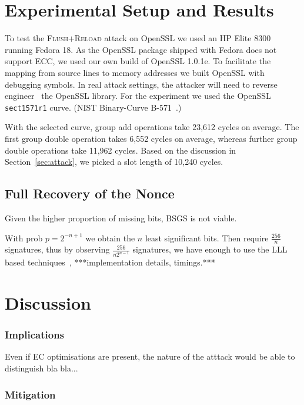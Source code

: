 \documentclass[twocolumn]{article}
\newcommand{\fl}{\textsc{Flu\-sh+\allowbreak Re\-load}\xspace}
\newcommand{\myupcase}[1]{\uppercase{#1}}
\begin{document}
\section{Experimental Setup and Results}\label{sec:results}

To test the \fl attack on OpenSSL we used an HP Elite 8300 running Fedora 18. As the OpenSSL package shipped with Fedora does not support \myupcase{ecc},
we used our own build of OpenSSL 1.0.1e. To facilitate the mapping from source lines to memory addresses we built OpenSSL with debugging symbols.
In real attack settings, the attacker will need to reverse engineer~\cite{cipsero10software} the OpenSSL library. For the experiment we used the OpenSSL \texttt{sect1571r1} curve. (NIST Binary-Curve B-571~\cite{fips}.)

With the selected curve, group add operations take 23,612 cycles on average. The first group double operation takes 6,552 cycles on average, whereas further group double operations take 11,962 cycles. Based on the discussion in Section~\ref{sec:attack}, we picked a slot length of 10,240 cycles.

\subsection{Full Recovery of the Nonce}\label{sub:full_nonce}

Given the higher proportion of missing bits, BSGS is not viable. 

With prob $p=2^{-n+1}$ we obtain the $n$ least significant bits. Then require $\frac{256}{n}$ signatures, thus by observing $\frac{256}{n2^{n-1}}$ signatures, we have enough to use the LLL based techniques~\cite{nguyen03insecurity}, ***implementation details, timings.***


\section{Discussion}\label{sec:discussion}


\subsubsection*{Implications}
Even if EC optimisations are present, the nature of the atttack would be able to distinguish bla bla... 


\subsubsection*{Mitigation}
\end{document}
